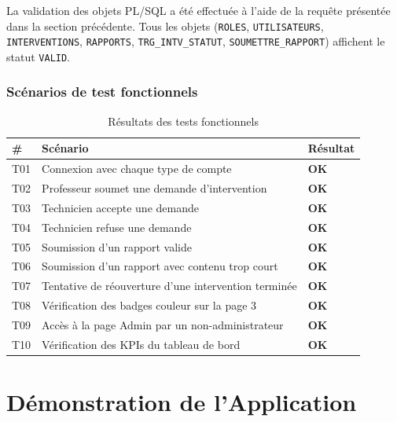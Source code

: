\documentclass[12pt,a4paper,oneside]{report}
\begin{document}
La validation des objets PL/SQL a été effectuée à l'aide de la requête présentée dans la section précédente. Tous les objets (\texttt{ROLES}, \texttt{UTILISATEURS}, \texttt{INTERVENTIONS}, \texttt{RAPPORTS}, \texttt{TRG\_INTV\_STATUT}, \texttt{SOUMETTRE\_RAPPORT}) affichent le statut \texttt{VALID}.

\subsection{Scénarios de test fonctionnels}

\begin{table}[H]
  \centering
  \caption{Résultats des tests fonctionnels}
  \begin{tabularx}{\linewidth}{@{}l X l@{}}
    \toprule
    \textbf{\#} & \textbf{Scénario} & \textbf{Résultat} \\
    \midrule
    T01 & Connexion avec chaque type de compte & \textcolor{green!60!black}{\textbf{OK}} \\
    T02 & Professeur soumet une demande d'intervention & \textcolor{green!60!black}{\textbf{OK}} \\
    T03 & Technicien accepte une demande & \textcolor{green!60!black}{\textbf{OK}} \\
    T04 & Technicien refuse une demande & \textcolor{green!60!black}{\textbf{OK}} \\
    T05 & Soumission d'un rapport valide & \textcolor{green!60!black}{\textbf{OK}} \\
    T06 & Soumission d'un rapport avec contenu trop court & \textcolor{green!60!black}{\textbf{OK}} \\
    T07 & Tentative de réouverture d'une intervention terminée & \textcolor{green!60!black}{\textbf{OK}} \\
    T08 & Vérification des badges couleur sur la page 3 & \textcolor{green!60!black}{\textbf{OK}} \\
    T09 & Accès à la page Admin par un non-administrateur & \textcolor{green!60!black}{\textbf{OK}} \\
    T10 & Vérification des KPIs du tableau de bord & \textcolor{green!60!black}{\textbf{OK}} \\
    \bottomrule
  \end{tabularx}
  \label{tab:tests}
\end{table}

\chapter{Démonstration de l'Application}
\end{document}
